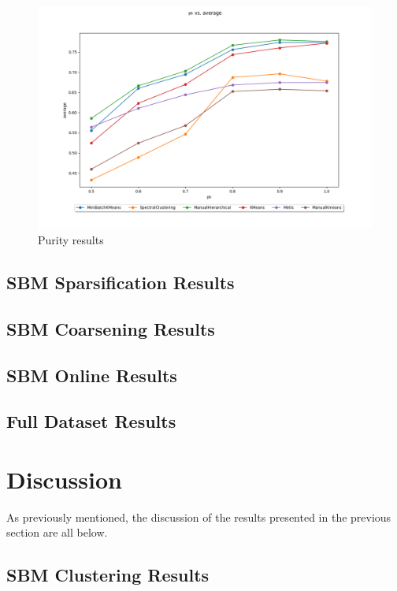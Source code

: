 \documentclass{article}
\begin{document}
\begin{figure}[H]
    \label{fig:results_average}
    \centering
    \includegraphics[width=1.0\textwidth]{results/results_average.png}
    \caption[Clustering average overall score across $p$]{Purity results}
\end{figure}

\subsection{SBM Sparsification Results}

\subsection{SBM Coarsening Results}

\subsection{SBM Online Results}

\subsection{Full Dataset Results}

\section{Discussion}\label{discussion}
As previously mentioned, the discussion of the results presented in the previous section are all below. 

\subsection{SBM Clustering Results}
\end{document}
